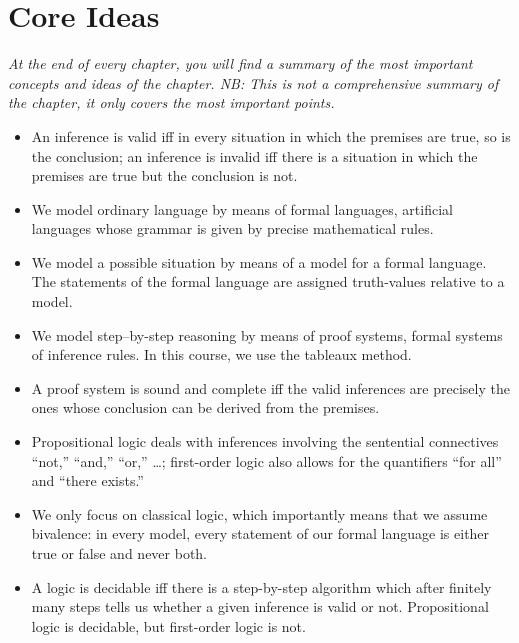 \section{Core Ideas}

\emph{At the end of every chapter, you will find a summary of the most important concepts and ideas of the chapter. NB: This is not a comprehensive summary of the chapter, it only covers the most important points.}

	\begin{itemize}

		\item An inference is valid iff in every situation in which the premises are true, so is the conclusion; an inference is invalid iff there is a situation in which the premises are true but the conclusion is not.
		
		\item We model ordinary language by means of formal languages, artificial languages whose grammar is given by precise mathematical rules.
		
		\item We model a possible situation by means of a model for a formal language. The statements of the formal language are assigned truth-values relative to a model.
		
		\item We model step--by-step reasoning by means of proof systems, formal systems of inference rules. In this course, we use the tableaux method.
		
		\item A proof system is sound and complete iff the valid inferences are precisely the ones whose conclusion can be derived from the premises.
		
		\item Propositional logic deals with inferences involving the sentential connectives ``not,'' ``and,'' ``or,'' \dots; first-order logic also allows for the quantifiers ``for all'' and ``there exists.''
		
		\item We only focus on classical logic, which importantly means that we assume bivalence: in every model, every statement of our formal language is either true or false and never both.
		
		\item A logic is decidable iff there is a step-by-step algorithm which after finitely many steps tells us whether a given inference is valid or not. Propositional logic is decidable, but first-order logic is not.

	\end{itemize}
	

